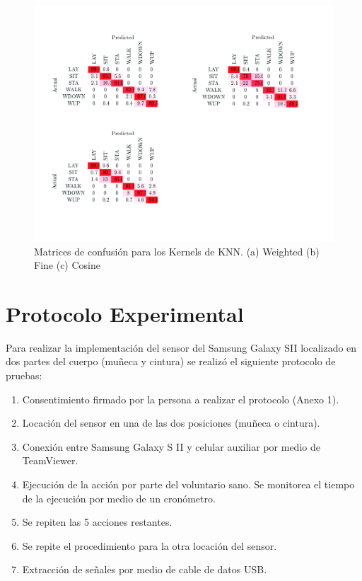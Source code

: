 \documentclass[11pt]{report}
\begin{document}
\begin{figure}[H]
  \centering
    \includegraphics[width=1.0\textwidth]{knn}
\caption{Matrices de confusión para los Kernels de KNN. (a) Weighted (b) Fine (c) Cosine}
\end{figure} 


\section{Protocolo Experimental}

Para realizar la implementación del sensor del Samsung Galaxy SII localizado en dos partes del cuerpo (muñeca y cintura) se realizó el siguiente protocolo de pruebas:

\begin{enumerate}
	\item Consentimiento firmado por la persona a realizar el protocolo (Anexo 1).
	\item Locación del sensor en una de las dos posiciones (muñeca o cintura).
	\item Conexión entre Samsung Galaxy S II y celular auxiliar por medio de TeamViewer.
	\item Ejecución de la acción por parte del voluntario sano. Se monitorea el tiempo de la ejecución por medio de un cronómetro.
	\item Se repiten las 5 acciones restantes.
	\item Se repite el procedimiento para la otra locación del sensor.
	\item Extracción de señales por medio de cable de datos USB.
\end{enumerate}
\end{document}
